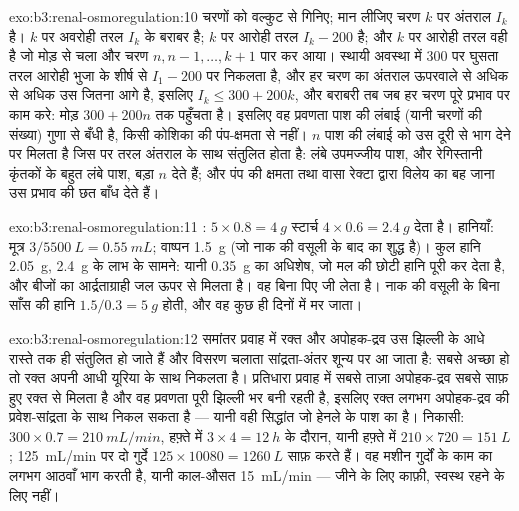 \begin{solution}{exo:b3:renal-osmoregulation:10}
चरणों को वल्कुट से गिनिए; मान लीजिए चरण $k$ पर अंतराल
$I_{k}$ है। $k$ पर अवरोही तरल $I_{k}$ के बराबर है; $k$ पर आरोही तरल
$I_{k} - 200$ है; और $k$ पर आरोही तरल वही है जो मोड़ से चला और चरण
$n, n-1, \dots, k+1$ पार कर आया। स्थायी अवस्था में \qty{300}{} पर
घुसता तरल आरोही भुजा के शीर्ष से $I_{1} - 200$ पर निकलता है, और हर चरण
का अंतराल ऊपरवाले से अधिक से अधिक उस  जितना आगे है, इसलिए
$I_{k} \le 300 + 200k$, और बराबरी तब जब हर चरण पूरे प्रभाव पर काम करे:
मोड़ $300 + 200n$ तक पहुँचता है। इसलिए वह प्रवणता पाश की लंबाई (यानी
चरणों की संख्या) गुणा  से बँधी है, किसी कोशिका की
पंप-क्षमता से नहीं। $n$ पाश की लंबाई को उस दूरी से भाग देने पर मिलता है
जिस पर तरल अंतराल के साथ संतुलित होता है: लंबे उपमज्जीय पाश, और
रेगिस्तानी कृंतकों के बहुत लंबे पाश, बड़ा $n$ देते हैं; और पंप की
क्षमता तथा वासा रेक्टा द्वारा विलेय का बह जाना उस प्रभाव की छत बाँध
देते हैं।
\end{solution}

\begin{solution}{exo:b3:renal-osmoregulation:11}
: $5\times 0.8 = \qty{4}{g}$ स्टार्च $4\times 0.6
= \qty{2.4}{g}$ देता है। हानियाँ: मूत्र $3/5500\ \unit{L} = \qty{0.55}{mL}$;
वाष्पन \qty{1.5}{g} (जो नाक की वसूली के बाद का शुद्ध है)। कुल हानि
\qty{2.05}{g}, \qty{2.4}{g} के लाभ के सामने: यानी \qty{0.35}{g} का
अधिशेष, जो मल की छोटी हानि पूरी कर देता है, और बीजों का आर्द्रताग्राही
जल ऊपर से मिलता है। वह बिना पिए जी लेता है। नाक की वसूली के बिना
साँस की हानि $1.5/0.3 = \qty{5}{g}$ होती, और वह कुछ ही दिनों में मर
जाता।
\end{solution}

\begin{solution}{exo:b3:renal-osmoregulation:12}
समांतर प्रवाह में रक्त और अपोहक-द्रव उस झिल्ली के आधे रास्ते तक ही
संतुलित हो जाते हैं और विसरण चलाता सांद्रता-अंतर शून्य पर आ जाता है:
सबसे अच्छा हो तो रक्त अपनी आधी यूरिया के साथ निकलता है। प्रतिधारा
प्रवाह में सबसे ताज़ा अपोहक-द्रव सबसे साफ़ हुए रक्त से मिलता है और वह
प्रवणता पूरी झिल्ली भर बनी रहती है, इसलिए रक्त लगभग अपोहक-द्रव की
प्रवेश-सांद्रता के साथ निकल सकता है --- यानी वही सिद्धांत जो हेनले के
पाश का है। निकासी: $300\times 0.7 =
\qty{210}{mL/min}$, हफ़्ते में $3\times 4 = \qty{12}{h}$ के दौरान, यानी हफ़्ते में
$210\times 720 = \qty{151}{L}$; \qty{125}{mL/min} पर दो गुर्दे
$125\times\num{10080} = \qty{1260}{L}$ साफ़ करते हैं। वह मशीन गुर्दों
के काम का लगभग आठवाँ भाग करती है, यानी काल-औसत
\qty{15}{mL/min} --- जीने के लिए काफ़ी, स्वस्थ रहने के लिए नहीं।
\end{solution}

